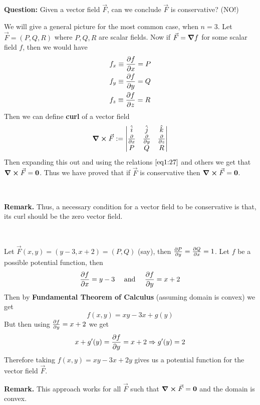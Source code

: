\documentclass[../Analysis-3.tex]{subfiles}
\begin{document}
\textbf{Question:} Given a vector field $\vec{F}$, can we conclude $\vec{F}$ is conservative? (NO!)

We will give a general picture for the most common case, when $n = 3$. Let $\vec{F} = (P,Q,R)$ where $P,Q,R$ are scalar fields. Now if $\vec{F} = \grad f$ for some scalar field $f$, then we would have
\begin{align}\label{eq1:27}
   & f_x \equiv \pdv{f}{x} = P \\
   & f_y \equiv \pdv{f}{y} = Q \\
   & f_z \equiv \pdv{f}{z} = R
\end{align}
Then we can define \textbf{curl} of a vector field
\[
  \curl \vec{F} := \begin{vmatrix}
    \hat{i}   & \hat{j}   & \hat{k}   \\
    \pdv{}{x} & \pdv{}{y} & \pdv{}{z} \\
    P         & Q         & R
  \end{vmatrix}
\]
Then expanding this out and using the relations $\ref{eq1:27}$ and others we get that $\curl \vec{F} = \mathbf{0}$. Thus we have proved that if $\vec{F}$ is conservative then $\curl \vec{F} = \mathbf{0}$.

\

\textbf{Remark.} Thus, a necessary condition for a vector field to be conservative is that, its curl should be the zero vector field.

\

\begin{Eg}{}{}
  Let $\vec{F}(x,y) = (y-3,x+2) = (P,Q)$ (say), then $\pdv{P}{y} = \pdv{Q}{x} = 1$. Let $f$ be a possible potential function, then
  \[
    \pdv{f}{x} = y-3 \quad \mbox{ and } \quad \pdv{f}{y} = x+2
  \]
  Then by \textbf{Fundamental Theorem of Calculus} (assuming domain is convex) we get
  \[
    f(x,y) = xy - 3x + g(y)
  \]
  But then using $\pdv{f}{y} = x+2$ we get
  \[
    x + g'(y) = \pdv{f}{y} = x+2 \Rightarrow g'(y) = 2
  \]
  Therefore taking $f(x,y) = xy - 3x + 2y$ gives us a potential function for the vector field $\vec{F}$.
\end{Eg}


\textbf{Remark.} This approach works for all $\vec{F}$ such that $\curl \vec{F} = \mathbf{0}$ and the domain is convex.
\end{document}
